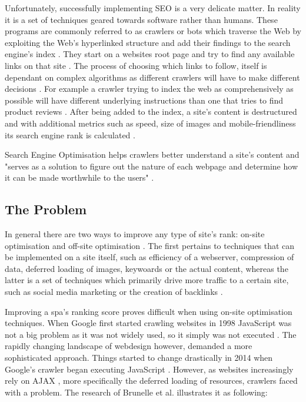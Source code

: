 Unfortunately, successfully implementing SEO is a very delicate matter. In reality it is a set of techniques geared towards software rather than humans. These programs are commonly referred to as crawlers or bots which traverse the Web by exploiting the Web's hyperlinked structure and add their findings to the search engine's index \cite{Fink2014:inbook,menczer2001evaluating:proceedings}. They start on a websites root page and try to find any available links on that site \cite{Fink2014:inbook}. The process of choosing which links to follow, itself is dependant on complex algorithms as different crawlers will have to make different decisions \cite{menczer2001evaluating:proceedings}. For example a crawler trying to index the web as comprehensively as possible will have different underlying instructions than one that tries to find product reviews \cite{menczer2001evaluating:proceedings}. After being added to the index, a site's content is destructured and with additional metrics such as speed, size of images and mobile-friendliness its search engine rank is calculated \cite{Fink2014:inbook}.

Search Engine Optimisation helps crawlers better understand a site's content and "serves as a solution to figure out the nature of each webpage and determine how it can be made worthwhile to the users" \cite{Khan2018:article}.

\subsection{The Problem}
In general there are two ways to improve any type of site's rank: on-site optimisation and off-site optimisation \cite{Khan2018:article}. The first pertains to techniques that can be implemented on a site itself, such as efficiency of a webserver, compression of data, deferred loading of images, keywoards or the actual content, whereas the latter is a set of techniques which primarily drive more traffic to a certain site, such as social media marketing or the creation of backlinks \cite{Khan2018:article}. 

Improving a \acrlong{spa}'s ranking score proves difficult when using on-site optimisation techniques. When Google first started crawling websites in 1998 JavaScript was not a big problem as it was not widely used, so it simply was not executed \cite{GoogleUsesJavascript:online}. The rapidly changing landscape of webdesign however, demanded a more sophisticated approach. Things started to change drastically in 2014 when Google's crawler began executing JavaScript \cite{GoogleUsesJavascript:online}. However, as websites increasingly rely on AJAX \cite[p.~97]{Brunelle2016:article}, more specifically the deferred loading of resources, crawlers faced with a problem. The research of Brunelle et al. \cite[p.~97]{Brunelle2016:article} illustrates it as following:

